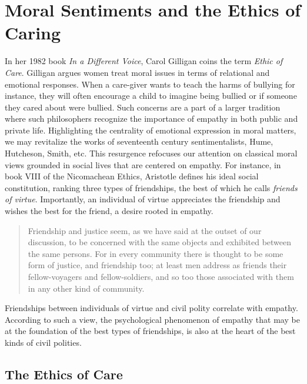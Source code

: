 \documentclass[12pt]{book}
\theoremstyle{definition}
\theoremstyle{remark}
\begin{document}
\section{Moral Sentiments and the Ethics of Caring}\label{moral-sentiments-and-the-ethics-of-caring}

In her 1982 book \emph{In a Different Voice}, Carol Gilligan coins the term \emph{Ethic of Care}. Gilligan argues women treat moral issues in terms of relational and emotional responses. When a care-giver wants to teach the harms of bullying for instance, they will often encourage a child to imagine being bullied or if someone they cared about were bullied. Such concerns are a part of a larger tradition where such philosophers recognize the importance of empathy in both public and private life. Highlighting the centrality of emotional expression in moral matters, we may revitalize the works of seventeenth century sentimentalists, Hume, Hutcheson, Smith, etc. This resurgence refocuses our attention on classical moral views grounded in social lives that are centered on empathy. For instance, in book VIII of the Nicomachean Ethics, Aristotle defines his ideal social constitution, ranking three types of friendships, the best of which he calls \emph{friends of virtue}. Importantly, an individual of virtue appreciates the friendship and wishes the best for the friend, a desire rooted in empathy.

\begin{quote}
Friendship and justice seem, as we have said at the outset of our discussion, to be concerned with the same objects and exhibited between the same persons. For in every community there is thought to be some form of justice, and friendship too; at least men address as friends their fellow-voyagers and fellow-soldiers, and so too those associated with them in any other kind of community.
\end{quote}

Friendships between individuals of virtue and civil polity correlate with empathy. According to such a view, the psychological phenomenon of empathy that may be at the foundation of the best types of friendships, is also at the heart of the best kinds of civil polities.

\subsection*{The Ethics of Care}\label{the-ethics-of-care}
\end{document}
